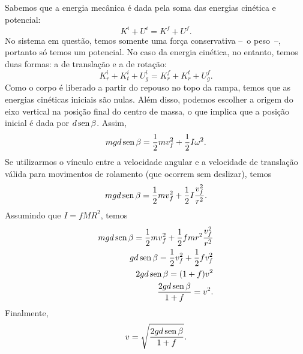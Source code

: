 Sabemos que a energia mecânica é dada pela soma das energias cinética e potencial:
\begin{equation}
    K^i + U^i = K^f + U^f.
\end{equation}
%
No sistema em questão, temos somente uma força conservativa --~o peso~--, portanto só temos um potencial. No caso da energia cinética, no entanto, temos duas formas: a de translação e a de rotação:
\begin{equation}
    K_r^i + K_t^i + U_g^i = K_r^f + K_r^t + U_g^f.
\end{equation}
%
Como o corpo é liberado a partir do repouso no topo da rampa, temos que as energias cinéticas iniciais são nulas. Além disso, podemos escolher a origem do eixo vertical na posição final do centro de massa, o que implica que a posição inicial é dada por $d\operatorname{sen}\beta$. Assim,
\begin{equation}
    mgd\operatorname{sen}\beta = \frac{1}{2} mv_f^2 + \frac{1}{2} I\omega^2.
\end{equation}
%
Se utilizarmos o vínculo entre a velocidade angular e a velocidade de translação válida para movimentos de rolamento (que ocorrem sem deslizar), temos
\begin{equation}
    mgd\operatorname{sen}\beta = \frac{1}{2} mv_f^2 + \frac{1}{2} I \frac{v_f^2}{r^2}.
\end{equation}
%
Assumindo que $I = f MR^2$, temos
\begin{align}
    mgd\operatorname{sen}\beta = \frac{1}{2} mv_f^2 + \frac{1}{2} f mr^2 \frac{v_f^2}{r^2} \\
    gd\operatorname{sen}\beta = \frac{1}{2} v_f^2 + \frac{1}{2} f v_f^2 \\
    2gd\operatorname{sen}\beta = (1 + f) v^2 \\
    \frac{2gd\operatorname{sen}\beta}{1 + f} = v^2.
\end{align}
%
Finalmente,
\begin{equation}
    v = \sqrt{\frac{2gd\operatorname{sen}\beta}{1 + f}}.
\end{equation}






